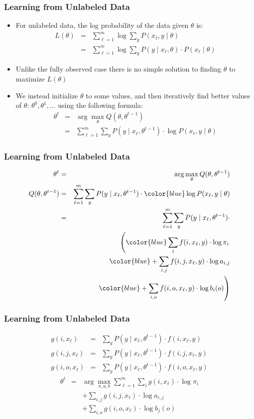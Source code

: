 \begin{frame}
\frametitle{Learning from Unlabeled Data}
\begin{itemize}[<+->]
\item For unlabeled data, the log probability of the data given $\theta$ is:
\begin{eqnarray*}
 L(\theta) &=& \sum_{\ell=1}^m \log \sum_y P(x_\ell,y \mid \theta) \\
 &=& \sum_{\ell=1}^m \log \sum_y P(y \mid x_\ell, \theta) \cdot P(x_\ell \mid \theta)
 \end{eqnarray*}
\item Unlike the fully observed case there is no simple solution to finding $\theta$ to maximize $L(\theta)$
\item We instead initialize $\theta$ to some values, and then iteratively find better values of $\theta$: $\theta^0, \theta^1, \ldots$ using the following formula:
\begin{eqnarray*}
\theta^t &=& \arg\max_\theta Q(\theta, \theta^{t-1})\\
&=& \sum_{\ell=1}^m \sum_y P(y \mid x_\ell, \theta^{t-1}) \cdot \log P(x_\ell, y \mid \theta) 
\end{eqnarray*}
\end{itemize}
\end{frame}

\begin{frame}
\frametitle{Learning from Unlabeled Data}
\begin{eqnarray*}
\theta^t &=& \arg\max_\theta Q(\theta, \theta^{t-1})\\
Q(\theta, \theta^{t-1}) &=& \sum_{\ell=1}^m \sum_y P(y \mid x_\ell, \theta^{t-1}) \cdot {\color{blue} \log P(x_\ell, y \mid \theta)} \\
&=& \sum_{\ell=1}^m \sum_y P(y \mid x_\ell, \theta^{t-1}) \cdot \\
&& \left( {\color{blue}  \sum_i f(i, x_\ell, y) \cdot \log \pi_i } \right. \\
&& {\color{blue} + \sum_{i,j} f(i,j,x_\ell,y) \cdot \log a_{i,j} } \\
&& \left. {\color{blue} + \sum_{i,o} f(i,o,x_\ell,y) \cdot \log b_i(o) } \right)
\end{eqnarray*}
\end{frame}

\begin{frame}
\frametitle{Learning from Unlabeled Data}
\begin{eqnarray*}
g(i,x_\ell) &=& \sum_y P(y \mid x_\ell, \theta^{t-1}) \cdot f(i, x_\ell, y) \\
g(i,j,x_\ell) &=& \sum_y P(y \mid x_\ell, \theta^{t-1}) \cdot f(i, j, x_\ell, y) \\
g(i,o,x_\ell) &=& \sum_y P(y \mid x_\ell, \theta^{t-1}) \cdot f(i, o, x_\ell, y)
\end{eqnarray*}
\begin{eqnarray*}
\theta^t & = & \arg\max_{\pi,a,b} \sum_{\ell=1}^m \sum_i g(i,x_\ell) \cdot \log \pi_i \\
&& + \sum_{i,j} g(i,j,x_\ell) \cdot \log a_{i,j} \\
&& + \sum_{i,o} g(i,o,x_\ell) \cdot \log b_j(o)
\end{eqnarray*}
\end{frame}

